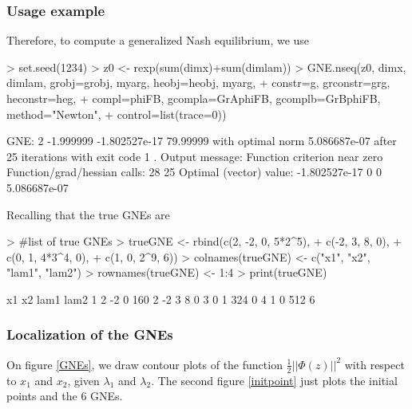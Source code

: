 \documentclass[11pt, a4paper]{article}
\begin{document}
\subsubsection{Usage example}

Therefore, to compute a generalized Nash equilibrium, we use
\begin{Schunk}
\begin{Sinput}
> set.seed(1234)
> z0 <- rexp(sum(dimx)+sum(dimlam))
> GNE.nseq(z0, dimx, dimlam, grobj=grobj, myarg, heobj=heobj, myarg, 
+ 	constr=g, grconstr=grg, heconstr=heg, 
+ 	compl=phiFB, gcompla=GrAphiFB, gcomplb=GrBphiFB, method="Newton", 
+ 	control=list(trace=0))
\end{Sinput}
\begin{Soutput}
GNE: 2 -1.999999 -1.802527e-17 79.99999 
with optimal norm 5.086687e-07 
after  25 iterations with exit code 1 .
Output message: Function criterion near zero 
Function/grad/hessian calls: 28 25 
Optimal (vector) value: -1.802527e-17 0 0 5.086687e-07 
\end{Soutput}
\end{Schunk}
Recalling that the true GNEs are
\begin{Schunk}
\begin{Sinput}
> #list of true GNEs
> trueGNE <- rbind(c(2, -2, 0, 5*2^5),
+ 	c(-2, 3, 8, 0),
+ 	c(0, 1, 4*3^4, 0),
+ 	c(1, 0, 2^9, 6))
> colnames(trueGNE) <- c("x1", "x2", "lam1", "lam2")
> rownames(trueGNE) <- 1:4
> print(trueGNE)
\end{Sinput}
\begin{Soutput}
  x1 x2 lam1 lam2
1  2 -2    0  160
2 -2  3    8    0
3  0  1  324    0
4  1  0  512    6
\end{Soutput}
\end{Schunk}

\subsubsection{Localization of the GNEs}

On figure \ref{GNEs}, we draw contour plots of the function $\frac{1}{2} || \Phi(z) ||^2$ with respect to $x_1$ and $x_2$, given $\lambda_1$ and $\lambda_2$. The second figure \ref{initpoint} just plots the initial points and the 6 GNEs.
\end{document}
